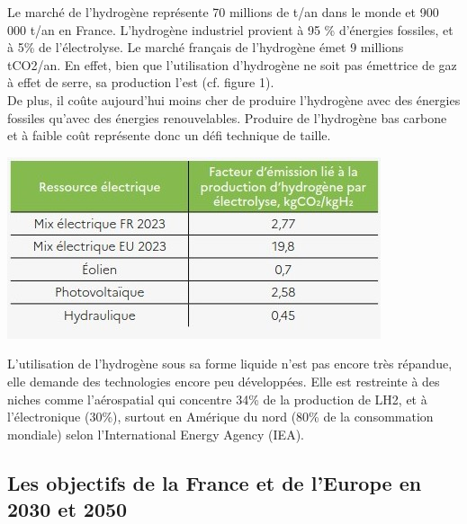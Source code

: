 \documentclass[11pt,french,a4paper]{article}
\begin{document}
\begin{multicols}{2}

Le marché de l’hydrogène représente 70 millions de t/an dans le monde et 900 000 t/an en France. L’hydrogène industriel provient à 95 \% d’énergies fossiles, et à 5\% de l’électrolyse. Le marché français de l’hydrogène émet 9 millions tCO2/an. En effet, bien que l’utilisation d’hydrogène ne soit pas émettrice de gaz à effet de serre, sa production l’est (cf. figure 1). \\

De plus, il coûte aujourd'hui moins cher de produire l’hydrogène avec des énergies fossiles qu’avec des énergies renouvelables. 
Produire de l'hydrogène bas carbone et à faible coût représente donc un défi technique de taille. \\

\begin{center}
\includegraphics[width=1\linewidth]{image/chap1/facteur_emission_prod_H2_electrolyse.jpg}
\label{fig: 1}
\end{center}

\end{multicols}

L’utilisation de l’hydrogène sous sa forme liquide n’est pas encore très répandue, elle demande des technologies encore peu développées. Elle est restreinte à des niches comme l’aérospatial qui concentre 34\% de la production de LH2, et à l’électronique (30\%), surtout en Amérique du nord (80\% de la consommation mondiale) selon l'International Energy Agency (IEA). \\


\subsection{Les objectifs de la France et de l'Europe en 2030 et 2050}
\end{document}
